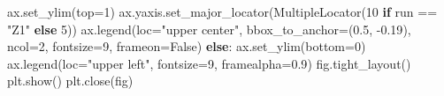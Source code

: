 \documentclass[
  ngerman,
  a4paper,
  DIV=11,
  oneside]{scrreprt}
\newenvironment{Shaded}{\begin{snugshade}}{\end{snugshade}}
\newcommand{\ControlFlowTok}[1]{\textcolor[rgb]{0.00,0.23,0.31}{\textbf{#1}}}
\newcommand{\DecValTok}[1]{\textcolor[rgb]{0.68,0.00,0.00}{#1}}
\newcommand{\FloatTok}[1]{\textcolor[rgb]{0.68,0.00,0.00}{#1}}
\newcommand{\NormalTok}[1]{\textcolor[rgb]{0.00,0.23,0.31}{#1}}
\newcommand{\OperatorTok}[1]{\textcolor[rgb]{0.37,0.37,0.37}{#1}}
\newcommand{\StringTok}[1]{\textcolor[rgb]{0.13,0.47,0.30}{#1}}
\newcommand{\VariableTok}[1]{\textcolor[rgb]{0.07,0.07,0.07}{#1}}
\begin{document}
\begin{Shaded}
\begin{Highlighting}[]
\NormalTok{        ax.set\_ylim(top}\OperatorTok{=}\DecValTok{1}\NormalTok{)}
\NormalTok{        ax.yaxis.set\_major\_locator(MultipleLocator(}\DecValTok{10} \ControlFlowTok{if}\NormalTok{ run }\OperatorTok{==} \StringTok{"Z1"} \ControlFlowTok{else} \DecValTok{5}\NormalTok{))}
\NormalTok{        ax.legend(loc}\OperatorTok{=}\StringTok{"upper center"}\NormalTok{, bbox\_to\_anchor}\OperatorTok{=}\NormalTok{(}\FloatTok{0.5}\NormalTok{, }\OperatorTok{{-}}\FloatTok{0.19}\NormalTok{),}
\NormalTok{                  ncol}\OperatorTok{=}\DecValTok{2}\NormalTok{, fontsize}\OperatorTok{=}\DecValTok{9}\NormalTok{, frameon}\OperatorTok{=}\VariableTok{False}\NormalTok{)}
    \ControlFlowTok{else}\NormalTok{:}
\NormalTok{        ax.set\_ylim(bottom}\OperatorTok{=}\DecValTok{0}\NormalTok{)}
\NormalTok{        ax.legend(loc}\OperatorTok{=}\StringTok{"upper left"}\NormalTok{, fontsize}\OperatorTok{=}\DecValTok{9}\NormalTok{, framealpha}\OperatorTok{=}\FloatTok{0.9}\NormalTok{)}
\NormalTok{    fig.tight\_layout()}
\NormalTok{    plt.show()}
\NormalTok{    plt.close(fig)}



\end{Highlighting}
\end{Shaded}
\end{document}
